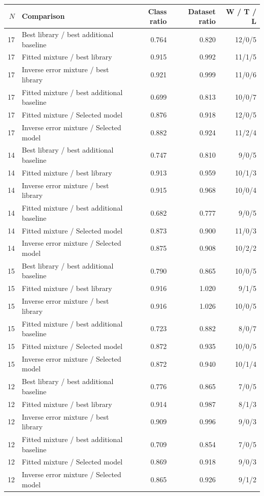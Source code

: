 \begin{tabular}{rlrrr}
\toprule
$N$ & Comparison & Class ratio & Dataset ratio & W / T / L \\
\midrule
17 & Best library / best additional baseline & 0.764 & 0.820 & 12/0/5 \\
17 & Fitted mixture / best library & 0.915 & 0.992 & 11/1/5 \\
17 & Inverse error mixture / best library & 0.921 & 0.999 & 11/0/6 \\
17 & Fitted mixture / best additional baseline & 0.699 & 0.813 & 10/0/7 \\
17 & Fitted mixture / Selected model & 0.876 & 0.918 & 12/0/5 \\
17 & Inverse error mixture / Selected model & 0.882 & 0.924 & 11/2/4 \\
14 & Best library / best additional baseline & 0.747 & 0.810 & 9/0/5 \\
14 & Fitted mixture / best library & 0.913 & 0.959 & 10/1/3 \\
14 & Inverse error mixture / best library & 0.915 & 0.968 & 10/0/4 \\
14 & Fitted mixture / best additional baseline & 0.682 & 0.777 & 9/0/5 \\
14 & Fitted mixture / Selected model & 0.873 & 0.900 & 11/0/3 \\
14 & Inverse error mixture / Selected model & 0.875 & 0.908 & 10/2/2 \\
15 & Best library / best additional baseline & 0.790 & 0.865 & 10/0/5 \\
15 & Fitted mixture / best library & 0.916 & 1.020 & 9/1/5 \\
15 & Inverse error mixture / best library & 0.916 & 1.026 & 10/0/5 \\
15 & Fitted mixture / best additional baseline & 0.723 & 0.882 & 8/0/7 \\
15 & Fitted mixture / Selected model & 0.872 & 0.935 & 10/0/5 \\
15 & Inverse error mixture / Selected model & 0.872 & 0.940 & 10/1/4 \\
12 & Best library / best additional baseline & 0.776 & 0.865 & 7/0/5 \\
12 & Fitted mixture / best library & 0.914 & 0.987 & 8/1/3 \\
12 & Inverse error mixture / best library & 0.909 & 0.996 & 9/0/3 \\
12 & Fitted mixture / best additional baseline & 0.709 & 0.854 & 7/0/5 \\
12 & Fitted mixture / Selected model & 0.869 & 0.918 & 9/0/3 \\
12 & Inverse error mixture / Selected model & 0.865 & 0.926 & 9/1/2 \\
\bottomrule
\end{tabular}

